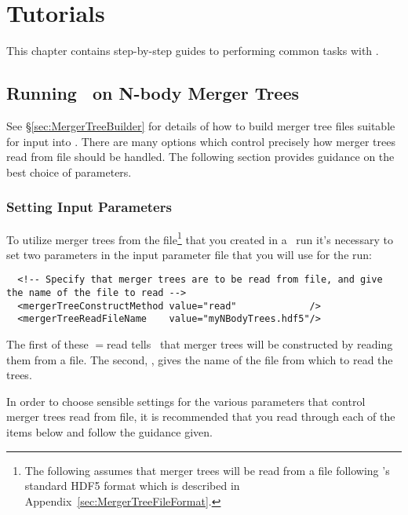 \chapter{Tutorials}

This chapter contains step-by-step guides to performing common tasks with \glc.

\section{Running \glc\ on N-body Merger Trees}\label{sec:nBodyRun}

See \S\ref{sec:MergerTreeBuilder} for details of how to build merger tree files suitable for input into \glc. There are many options which control precisely how merger trees read from file should be handled. The following section provides guidance on the best choice of parameters.

\subsection{Setting Input Parameters}

To utilize merger trees from the file\footnote{The following assumes that merger trees will be read from a file following \protect\glc's standard HDF5 format which is described in Appendix~\protect\ref{sec:MergerTreeFileFormat}.} that you created in a \glc\ run it's necessary to set two parameters in the input parameter file that you will use for the run:
\begin{verbatim}
  <!-- Specify that merger trees are to be read from file, and give the name of the file to read -->
  <mergerTreeConstructMethod value="read"             />
  <mergerTreeReadFileName    value="myNBodyTrees.hdf5"/>
\end{verbatim}
The first of these {\normalfont \ttfamily [mergerTreeConstructMethod]}$=${\normalfont \ttfamily read} tells \glc\ that merger trees will be constructed by reading them from a file. The second, {\normalfont \ttfamily [mergerTreeReadFileName]}, gives the name of the file from which to read the trees.

In order to choose sensible settings for the various parameters that control merger trees read from file, it is recommended that you read through each of the items below and follow the guidance given.

